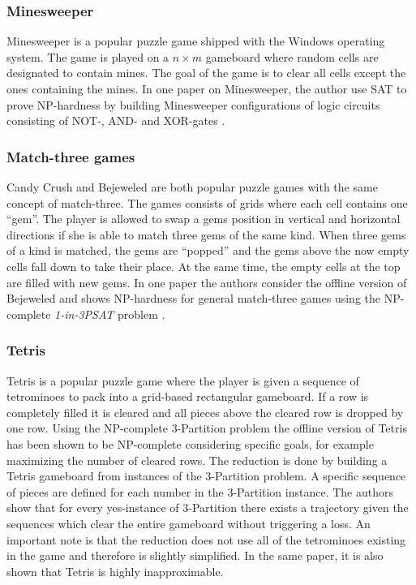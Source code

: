 \subsubsection{Minesweeper}
Minesweeper is a popular puzzle game shipped with the Windows operating system. The game is played on a $n \times m$ gameboard where random cells are designated to contain mines. The goal of the game is to clear all cells except the ones containing the mines. In one paper on Minesweeper, the author use SAT to prove NP-hardness by building Minesweeper configurations of logic circuits consisting of NOT-, AND- and XOR-gates \cite{minesweeper}.

\subsubsection{Match-three games}

Candy Crush and Bejeweled are both popular puzzle games with the same concept of match-three. The games consists of grids where each cell contains one ``gem''. The player is allowed to swap a gems position in vertical and horizontal directions if she is able to match three gems of the same kind. When three gems of a kind is matched, the gems are ``popped'' and the gems above the now empty cells fall down to take their place. At the same time, the empty cells at the top are filled with new gems. In one paper the authors consider the offline version of Bejeweled and shows NP-hardness for general match-three games using the NP-complete \textit{1-in-3PSAT} problem \cite{candy}.

\subsubsection{Tetris}

Tetris is a popular puzzle game where the player is given a sequence of tetrominoes to pack into a grid-based rectangular gameboard. If a row is completely filled it is cleared and all pieces above the cleared row is dropped by one row. Using the NP-complete 3-Partition problem the offline version of Tetris has been shown to be NP-complete considering specific goals, for example maximizing the number of cleared rows. The reduction is done by building a Tetris gameboard from instances of the 3-Partition problem. A specific sequence of pieces are defined for each number in the 3-Partition instance. The authors show that for every yes-instance of 3-Partition there exists a trajectory given the sequences which clear the entire gameboard without triggering a loss. An important note is that the reduction does not use all of the tetrominoes existing in the game and therefore is slightly simplified. In the same paper, it is also shown that Tetris is highly inapproximable. 

